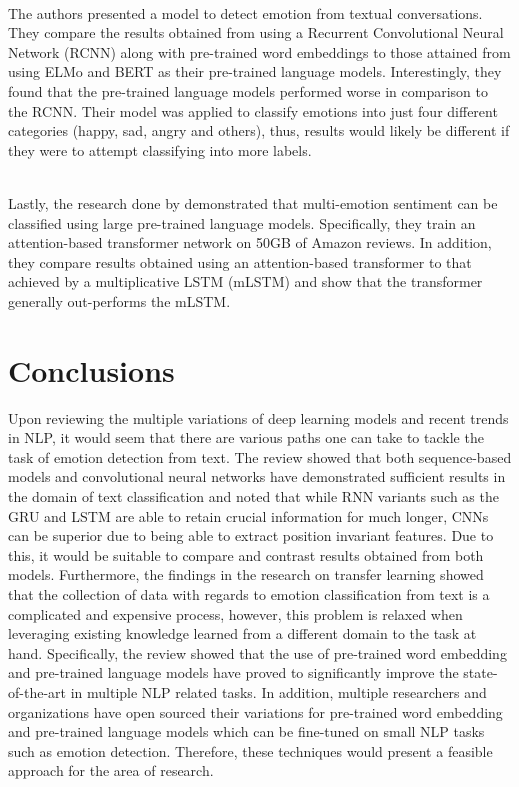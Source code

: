 \noindent
\\ The authors \citep{zhong2019ntuer} presented a model to detect emotion from textual conversations. They compare the results obtained from using a Recurrent Convolutional Neural Network (RCNN) along with pre-trained word embeddings to those attained from using ELMo and BERT as their pre-trained language models. Interestingly, they found that the pre-trained language models performed worse in comparison to the RCNN. Their model was applied to classify emotions into just four different categories (happy, sad, angry and others), thus, results would likely be different if they were to attempt classifying into more labels. 

\noindent
\\ Lastly, the research done by \citep{1812.01207} demonstrated that multi-emotion sentiment can be classified using large pre-trained language models. Specifically, they train an attention-based transformer network on 50GB of Amazon reviews. In addition, they compare results obtained using an attention-based transformer to that achieved by a multiplicative LSTM (mLSTM) and show that the transformer generally out-performs the mLSTM. 

\section{Conclusions}

Upon reviewing the multiple variations of deep learning models and recent trends in NLP, it would seem that there are various paths one can take to tackle the task of emotion detection from text. The review showed that both sequence-based models and convolutional neural networks have demonstrated sufficient results in the domain of text classification and noted that while RNN variants such as the GRU and LSTM are able to retain crucial information for much longer, CNNs can be superior due to being able to extract position invariant features. Due to this, it would be suitable to compare and contrast results obtained from both models. Furthermore, the findings in the research on transfer learning showed that the collection of data with regards to emotion classification from text is a complicated and expensive process, however, this problem is relaxed when leveraging existing knowledge learned from a different domain to the task at hand. Specifically, the review showed that the use of pre-trained word embedding and pre-trained language models have proved to significantly improve the state-of-the-art in multiple NLP related tasks. In addition, multiple researchers and organizations have open sourced their variations for pre-trained word embedding and pre-trained language models which can be fine-tuned on small NLP tasks such as emotion detection. Therefore, these techniques would present a feasible approach for the area of research. 



